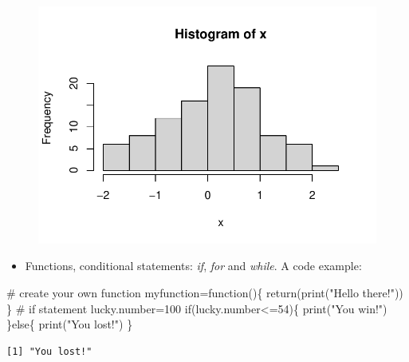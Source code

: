 \documentclass[
  letterpaper,
  DIV=11,
  numbers=noendperiod]{scrreprt}
\newenvironment{Shaded}{\begin{snugshade}}{\end{snugshade}}
\newcommand{\CommentTok}[1]{\textcolor[rgb]{0.37,0.37,0.37}{#1}}
\newcommand{\ControlFlowTok}[1]{\textcolor[rgb]{0.00,0.23,0.31}{#1}}
\newcommand{\DecValTok}[1]{\textcolor[rgb]{0.68,0.00,0.00}{#1}}
\newcommand{\FunctionTok}[1]{\textcolor[rgb]{0.28,0.35,0.67}{#1}}
\newcommand{\NormalTok}[1]{\textcolor[rgb]{0.00,0.23,0.31}{#1}}
\newcommand{\OtherTok}[1]{\textcolor[rgb]{0.00,0.23,0.31}{#1}}
\newcommand{\SpecialCharTok}[1]{\textcolor[rgb]{0.37,0.37,0.37}{#1}}
\newcommand{\StringTok}[1]{\textcolor[rgb]{0.13,0.47,0.30}{#1}}
\providecommand{\tightlist}{%
  \setlength{\itemsep}{0pt}\setlength{\parskip}{0pt}}\usepackage{longtable,booktabs,array}
\begin{document}
\begin{figure}[H]

{\centering \includegraphics{t4ds/week1_files/figure-pdf/unnamed-chunk-3-1.pdf}

}

\end{figure}

\begin{itemize}
\tightlist
\item
  Functions, conditional statements: \emph{if}, \emph{for} and
  \emph{while}. A code example:
\end{itemize}

\begin{Shaded}
\begin{Highlighting}[]
\CommentTok{\# create your own function}
\NormalTok{  myfunction}\OtherTok{=}\ControlFlowTok{function}\NormalTok{()\{}
    \FunctionTok{return}\NormalTok{(}\FunctionTok{print}\NormalTok{(}\StringTok{"Hello there!"}\NormalTok{))}
\NormalTok{  \}}
\CommentTok{\# if statement}
\NormalTok{lucky.number}\OtherTok{=}\DecValTok{100}
\ControlFlowTok{if}\NormalTok{(lucky.number}\SpecialCharTok{\textless{}=}\DecValTok{54}\NormalTok{)\{}
\FunctionTok{print}\NormalTok{(}\StringTok{"You win!"}\NormalTok{)}
\NormalTok{  \}}\ControlFlowTok{else}\NormalTok{\{}
  \FunctionTok{print}\NormalTok{(}\StringTok{"You lost!"}\NormalTok{)}
\NormalTok{\}}
\end{Highlighting}
\end{Shaded}

\begin{verbatim}
[1] "You lost!"
\end{verbatim}
\end{document}
